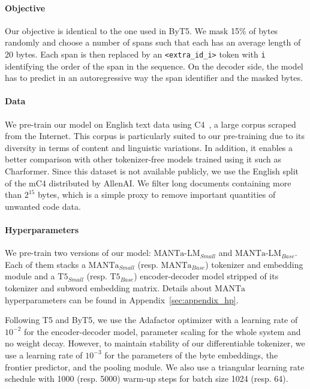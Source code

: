 \paragraph{Objective}
Our objective is identical to the one used in ByT5. We mask 15\% of bytes randomly and choose a number of spans such that each has an average length of 20 bytes. Each span is then replaced by an \texttt{<extra\_id\_i>} token with \texttt{i} identifying the order of the span in the sequence. On the decoder side, the model has to predict in an autoregressive way the span identifier and the masked bytes.

\paragraph{Data}
We pre-train our model on English text data using C4~\cite{raffel2020t5}, a large corpus scraped from the Internet. This corpus is particularly suited to our pre-training due to its diversity in terms of content and linguistic variations. In addition, it enables a better comparison with other tokenizer-free models trained using it such as Charformer. Since this dataset is not available publicly, we use the English split of the mC4 distributed by AllenAI. We filter long documents containing more than $2^{15}$ bytes, which is a simple proxy to remove important quantities of unwanted code data.

\paragraph{Hyperparameters}
We pre-train two versions of our model: $\text{MANTa-LM}_{Small}$ and $\text{MANTa-LM}_{Base}$. Each of them stacks a $\text{MANTa}_{Small}$ (resp. $\text{MANTa}_{Base}$) tokenizer and embedding module and a $\text{T5}_{Small}$ (resp. $\text{T5}_{Base}$) encoder-decoder model stripped of its tokenizer and subword embedding matrix. Details about $\text{MANTa}$ hyperparameters can be found in Appendix~\ref{sec:appendix_hp}.

Following T5 and ByT5, we use the Adafactor optimizer with a learning rate of $10^{-2}$ for the encoder-decoder model, parameter scaling for the whole system and no weight decay. However, to maintain stability of our differentiable tokenizer, we use a learning rate of $10^{-3}$ for the parameters of the byte embeddings, the frontier predictor, and the pooling module. We also use a triangular learning rate schedule with 1000 (resp. 5000) warm-up steps for batch size 1024 (resp. 64).

